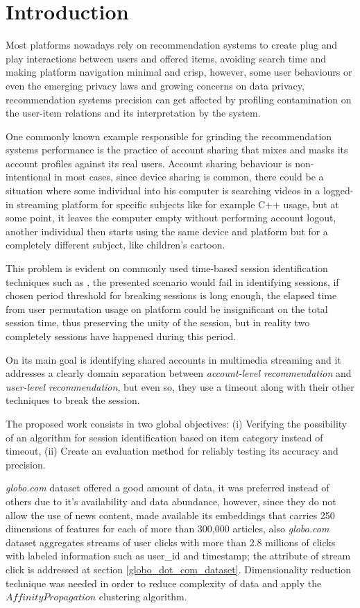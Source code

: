\documentclass[ecp,tc,english]{iiufrgs}
\begin{document}
\chapter{Introduction}
Most platforms nowadays rely on recommendation systems to create plug and play interactions between users and offered items, avoiding search time and making platform navigation minimal and crisp, however, some user behaviours or even the emerging privacy laws and growing concerns on data privacy, recommendation systems precision can get affected by profiling contamination on the user-item relations  and its interpretation by the system.

One commonly known example responsible for grinding the recommendation systems performance is the practice of account sharing that mixes and masks its account profiles against its real users. Account sharing behaviour is non-intentional in most cases, since device sharing is common, there could be a situation where some individual into his computer is searching videos in a logged-in streaming platform for specific subjects like for example C++ usage, but at some point, it leaves the computer empty without performing account logout, another individual then starts using the same device and platform but for a completely different subject, like children's cartoon.

This problem is evident on commonly used time-based session identification techniques such as \cite{halfaker2015}, the presented scenario would fail in identifying sessions, if chosen period threshold for breaking sessions is long enough, the elapsed time from user permutation usage on platform could be insignificant on the total session time, thus preserving the unity of the session, but in reality two completely sessions have happened during this period.

On \cite{jiang2018} its main goal is identifying shared accounts in multimedia streaming and it addresses a clearly domain separation between \textit{account-level recommendation} and \textit{user-level recommendation}, but even so, they use a timeout along with their other techniques to break the session.

The proposed work consists in two global objectives: (i) Verifying the possibility of an algorithm for session identification based on item category instead of timeout, 
(ii) Create an evaluation method for reliably testing its accuracy and precision.

\textit{globo.com} dataset offered a good amount of data, it was preferred instead of others due to it's availability and data abundance, however, since they do not allow the use of news content, \cite{moreira2018chameleon} made available its embeddings that carries 250 dimensions of features for each of more than 300,000 articles, also \textit{globo.com} dataset aggregates streams of user clicks with more than 2.8 millions of clicks with labeled information such as user\_id and timestamp; the attribute of stream click is addressed at section \ref{globo_dot_com_dataset}.
Dimensionality reduction technique was needed in order to reduce complexity of data and apply the \(Affinity Propagation\) clustering algorithm. 
\end{document}

